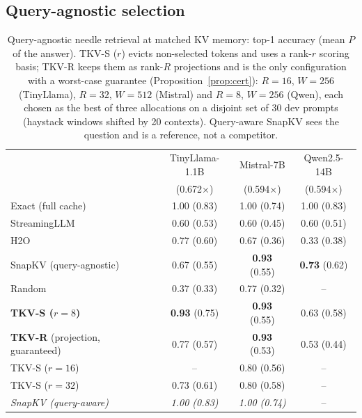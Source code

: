 \documentclass{article}
\begin{document}
\subsection{Query-agnostic selection}
\label{sec:main}

\begin{table}[t]
\centering
\caption{Query-agnostic needle retrieval at matched KV memory: top-1 accuracy
(mean $P$ of the answer). TKV-S ($r$) evicts non-selected tokens and uses a
rank-$r$ scoring basis; TKV-R keeps them as rank-$R$ projections and is the only
configuration with a worst-case guarantee (Proposition~\ref{prop:cert}):
$R{=}16$, $W{=}256$ (TinyLlama), $R{=}32$, $W{=}512$ (Mistral) and $R{=}8$,
$W{=}256$ (Qwen), each chosen as the best of three allocations on a disjoint
set of 30 dev prompts (haystack windows shifted by 20 contexts).
Query-aware SnapKV sees the question and is a reference, not a competitor.}
\label{tab:main}
\small
\begin{tabular}{lccc}
\toprule
& TinyLlama-1.1B & Mistral-7B & Qwen2.5-14B \\
& (0.672$\times$) & (0.594$\times$) & (0.594$\times$) \\
\midrule
Exact (full cache)       & 1.00 (0.83) & 1.00 (0.74) & 1.00 (0.83) \\
\midrule
StreamingLLM             & 0.60 (0.53) & 0.60 (0.45) & 0.60 (0.51) \\
H2O                      & 0.77 (0.60) & 0.67 (0.36) & 0.33 (0.38) \\
SnapKV (query-agnostic)  & 0.67 (0.55) & \textbf{0.93} (0.55) & \textbf{0.73} (0.62) \\
Random                   & 0.37 (0.33) & 0.77 (0.32) & -- \\
\textbf{TKV-S ($r{=}8$)} & \textbf{0.93} (0.75) & \textbf{0.93} (0.55) & 0.63 (0.58) \\
\textbf{TKV-R} (projection, guaranteed) & 0.77 (0.57) & \textbf{0.93} (0.53) & 0.53 (0.44) \\
TKV-S ($r{=}16$)         & -- & 0.80 (0.56) & -- \\
TKV-S ($r{=}32$)         & 0.73 (0.61) & 0.80 (0.58) & -- \\
\midrule
\emph{SnapKV (query-aware)} & \emph{1.00 (0.83)} & \emph{1.00 (0.74)} & -- \\
\bottomrule
\end{tabular}
\end{table}
\end{document}

